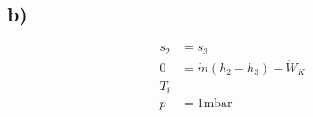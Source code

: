 

\subsection*{b)}
\begin{align*}
    s_2 &= s_3 \\
    0 &= \dot{m} (h_2 - h_3) - \dot{W}_K \\
    T_i \\
    p &= 1 \text{mbar}
\end{align*}